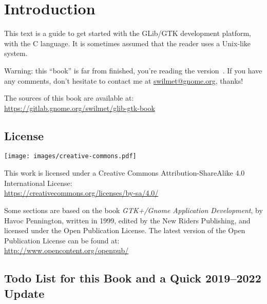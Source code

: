 \chapter{Introduction}

This text is a guide to get started with the GLib/GTK development platform, with the C language. It is sometimes assumed that the reader uses a Unix-like system.

Warning: this ``book'' is far from finished, you're reading the version~\bookversion. If you have any comments, don't hesitate to contact me at \url{swilmet@gnome.org}, thanks!

The sources of this book are available at:\\
\url{https://gitlab.gnome.org/swilmet/glib-gtk-book}

\section{License}
\label{intro-license}

\begin{center}
  \texttt{[image: images/creative-commons.pdf]}
\end{center}

This work is licensed under a Creative Commons Attribution-ShareAlike 4.0 International License:\\
\url{https://creativecommons.org/licenses/by-sa/4.0/}

Some sections are based on the book \emph{GTK+/Gnome Application Development}, by Havoc Pennington, written in 1999, edited by the New Riders Publishing, and licensed under the Open Publication License. The latest version of the Open Publication License can be found at:\\
\url{http://www.opencontent.org/openpub/}

\section{Todo List for this Book and a Quick 2019--2022 Update}

